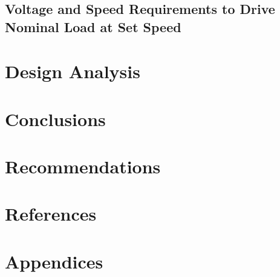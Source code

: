 \documentclass[12pt]{report}
\begin{document}
	
	
	\section{Voltage and Speed Requirements to Drive Nominal Load at Set Speed}
	
	\chapter{Design Analysis}
	
	\chapter{Conclusions}
	
	\chapter{Recommendations}
	
	\chapter{References}
	
	\chapter{Appendices}
	
	
\end{document}
